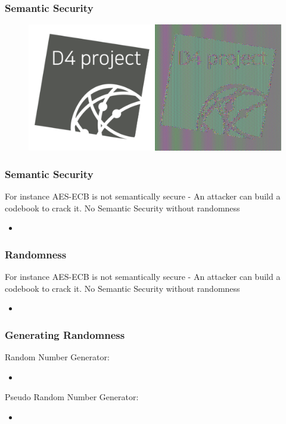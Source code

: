 \documentclass{beamer}
\begin{document}
\begin{frame}
        \frametitle{Semantic Security}
        \begin{figure}
          \centering
          \includegraphics[width=\textwidth]{d4-ecb.pdf}
        \end{figure}
        
\end{frame}


\begin{frame}
        \frametitle{Semantic Security}
For instance AES-ECB is not semantically secure - An attacker can build a
codebook to crack it.
        No Semantic Security without randomness

        \begin{itemize}
          \item
        \end{itemize}

\end{frame}

\begin{frame}
        \frametitle{Randomness}

For instance AES-ECB is not semantically secure - An attacker can build a
codebook to crack it.
        No Semantic Security without randomness

        \begin{itemize}
          \item
        \end{itemize}

\end{frame}




\begin{frame}
        \frametitle{Generating Randomness}

        Random Number Generator:
        \begin{itemize}
          \item
        \end{itemize}

        Pseudo Random Number Generator:
        \begin{itemize}
          \item
        \end{itemize}

\end{frame}
\end{document}
